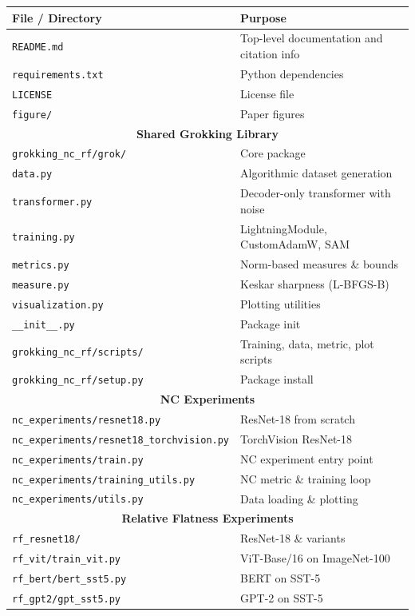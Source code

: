 \documentclass[11pt,a4paper]{article}
\theoremstyle{definition}
\begin{document}
\begin{center}
\small
\begin{tabular}{lp{10cm}}
\toprule
\textbf{File / Directory} & \textbf{Purpose} \\
\midrule
\texttt{README.md} & Top-level documentation and citation info \\
\texttt{requirements.txt} & Python dependencies \\
\texttt{LICENSE} & License file \\
\texttt{figure/} & Paper figures \\
\midrule
\multicolumn{2}{c}{\textbf{Shared Grokking Library}} \\
\midrule
\texttt{grokking\_nc\_rf/grok/} & Core package \\
\hspace{5mm}\texttt{data.py} & Algorithmic dataset generation \\
\hspace{5mm}\texttt{transformer.py} & Decoder-only transformer with noise \\
\hspace{5mm}\texttt{training.py} & LightningModule, CustomAdamW, SAM \\
\hspace{5mm}\texttt{metrics.py} & Norm-based measures \& bounds \\
\hspace{5mm}\texttt{measure.py} & Keskar sharpness (L-BFGS-B) \\
\hspace{5mm}\texttt{visualization.py} & Plotting utilities \\
\hspace{5mm}\texttt{\_\_init\_\_.py} & Package init \\
\texttt{grokking\_nc\_rf/scripts/} & Training, data, metric, plot scripts \\
\texttt{grokking\_nc\_rf/setup.py} & Package install \\
\midrule
\multicolumn{2}{c}{\textbf{NC Experiments}} \\
\midrule
\texttt{nc\_experiments/resnet18.py} & ResNet-18 from scratch \\
\texttt{nc\_experiments/resnet18\_torchvision.py} & TorchVision ResNet-18 \\
\texttt{nc\_experiments/train.py} & NC experiment entry point \\
\texttt{nc\_experiments/training\_utils.py} & NC metric \& training loop \\
\texttt{nc\_experiments/utils.py} & Data loading \& plotting \\
\midrule
\multicolumn{2}{c}{\textbf{Relative Flatness Experiments}} \\
\midrule
\texttt{rf\_resnet18/} & ResNet-18 \& variants \\
\texttt{rf\_vit/train\_vit.py} & ViT-Base/16 on ImageNet-100 \\
\texttt{rf\_bert/bert\_sst5.py} & BERT on SST-5 \\
\texttt{rf\_gpt2/gpt\_sst5.py} & GPT-2 on SST-5 \\
\bottomrule
\end{tabular}
\end{center}
\end{document}
